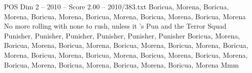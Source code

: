 \begin{textsample}{POS Dim 2 – 2010 – Score 2.00 – 2010/383.txt}
Boricua, Morena, Boricua, Morena, Boricua, Morena, Boricua, Morena, Boricua, Morena, Boricua, Morena No more rolling with none to rush, unless it 's Pun and the Terror Squad Punisher, Punisher, Punisher, Punisher, Punisher, Punisher Boricua, Morena, Boricua, Morena, Boricua, Morena, Boricua, Morena, Boricua, Morena, Boricua, Morena, Boricua, Morena, Boricua, Morena, Boricua, Morena, Boricua, Morena, Boricua, Morena, Boricua, Morena, Boricua, Morena, Boricua, Morena Mmm

\end{textsample}
